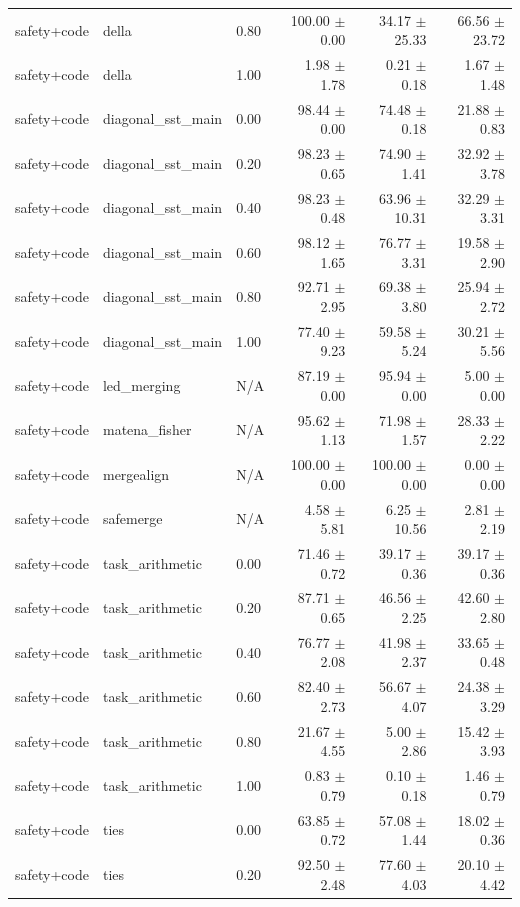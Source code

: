\documentclass{article}
\begin{document}
\begin{table}[H]
{\begin{tabular}{lllrrr}
safety+code & della & 0.80 & 100.00 $\pm$ 0.00 & 34.17 $\pm$ 25.33 & 66.56 $\pm$ 23.72 \\
safety+code & della & 1.00 & 1.98 $\pm$ 1.78 & 0.21 $\pm$ 0.18 & 1.67 $\pm$ 1.48 \\
safety+code & diagonal\_sst\_main & 0.00 & 98.44 $\pm$ 0.00 & 74.48 $\pm$ 0.18 & 21.88 $\pm$ 0.83 \\
safety+code & diagonal\_sst\_main & 0.20 & 98.23 $\pm$ 0.65 & 74.90 $\pm$ 1.41 & 32.92 $\pm$ 3.78 \\
safety+code & diagonal\_sst\_main & 0.40 & 98.23 $\pm$ 0.48 & 63.96 $\pm$ 10.31 & 32.29 $\pm$ 3.31 \\
safety+code & diagonal\_sst\_main & 0.60 & 98.12 $\pm$ 1.65 & 76.77 $\pm$ 3.31 & 19.58 $\pm$ 2.90 \\
safety+code & diagonal\_sst\_main & 0.80 & 92.71 $\pm$ 2.95 & 69.38 $\pm$ 3.80 & 25.94 $\pm$ 2.72 \\
safety+code & diagonal\_sst\_main & 1.00 & 77.40 $\pm$ 9.23 & 59.58 $\pm$ 5.24 & 30.21 $\pm$ 5.56 \\
safety+code & led\_merging & N/A & 87.19 $\pm$ 0.00 & 95.94 $\pm$ 0.00 & 5.00 $\pm$ 0.00 \\
safety+code & matena\_fisher & N/A & 95.62 $\pm$ 1.13 & 71.98 $\pm$ 1.57 & 28.33 $\pm$ 2.22 \\
safety+code & mergealign & N/A & 100.00 $\pm$ 0.00 & 100.00 $\pm$ 0.00 & 0.00 $\pm$ 0.00 \\
safety+code & safemerge & N/A & 4.58 $\pm$ 5.81 & 6.25 $\pm$ 10.56 & 2.81 $\pm$ 2.19 \\
safety+code & task\_arithmetic & 0.00 & 71.46 $\pm$ 0.72 & 39.17 $\pm$ 0.36 & 39.17 $\pm$ 0.36 \\
safety+code & task\_arithmetic & 0.20 & 87.71 $\pm$ 0.65 & 46.56 $\pm$ 2.25 & 42.60 $\pm$ 2.80 \\
safety+code & task\_arithmetic & 0.40 & 76.77 $\pm$ 2.08 & 41.98 $\pm$ 2.37 & 33.65 $\pm$ 0.48 \\
safety+code & task\_arithmetic & 0.60 & 82.40 $\pm$ 2.73 & 56.67 $\pm$ 4.07 & 24.38 $\pm$ 3.29 \\
safety+code & task\_arithmetic & 0.80 & 21.67 $\pm$ 4.55 & 5.00 $\pm$ 2.86 & 15.42 $\pm$ 3.93 \\
safety+code & task\_arithmetic & 1.00 & 0.83 $\pm$ 0.79 & 0.10 $\pm$ 0.18 & 1.46 $\pm$ 0.79 \\
safety+code & ties & 0.00 & 63.85 $\pm$ 0.72 & 57.08 $\pm$ 1.44 & 18.02 $\pm$ 0.36 \\
safety+code & ties & 0.20 & 92.50 $\pm$ 2.48 & 77.60 $\pm$ 4.03 & 20.10 $\pm$ 4.42 \\

\end{tabular}}
\end{table}
\end{document}
